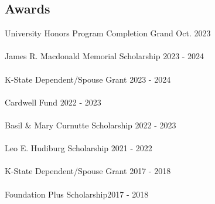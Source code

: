 \documentclass{article}
\begin{document}
\subsection*{Awards}
University Honors Program Completion Grand \hfill Oct. 2023 \\\\
James R. Macdonald Memorial Scholarship \hfill 2023 - 2024 \\\\
K-State Dependent/Spouse Grant \hfill2023 - 2024 \\\\
Cardwell Fund \hfill 2022 - 2023 \\\\
Basil \& Mary Curnutte Scholarship \hfill 2022 - 2023 \\\\
Leo E. Hudiburg Scholarship \hfill 2021 - 2022 \\\\
K-State Dependent/Spouse Grant \hfill2017 - 2018 \\\\
Foundation Plus Scholarship\hfill 2017 - 2018
\end{document}
